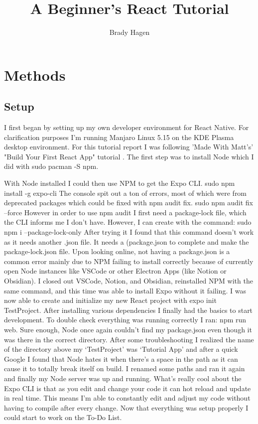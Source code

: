\documentclass[10pt,twocolumn]{article}
\title{A Beginner's React Tutorial}
\author{Brady Hagen}
\affiliation{Occidental College}
\begin{document}
\maketitle

\section{Methods}
\subsection{Setup}
I first began by setting up my own developer environment for React Native. For clarification purposes I’m running Manjaro Linux  5.15 on the KDE Plasma desktop environment. For this tutorial report I was following 'Made With Matt's' "Build Your First React App" tutorial \cite{BuildingMyFirstReactApp}.
The first step was to install Node which I did with
sudo pacman -S npm.


With Node installed I could then use NPM to get the Expo CLI.
sudo npm install -g expo-cli
The console spit out a ton of errors, most of which were from deprecated packages which could be fixed with npm audit fix.
sudo npm audit fix –force
However in order to use npm audit I first need a package-lock file, which the CLI informs me I don’t have. However, I can create with the command:
sudo npm i –package-lock-only
After trying it I found that this command doesn’t work as it needs another .json file. It needs a (package.json to complete and make the package-lock.json file. Upon looking online, not having a package.json is a common error mainly due to NPM failing to install correctly because of currently open Node instances like VSCode or other Electron Apps (like Notion or Obsidian).
I closed out VSCode, Notion, and Obsidian, reinstalled NPM with the same command, and this time was able to install Expo without it failing.
I was now able to create and initialize my new React project with expo init TestProject.
After installing various dependencies I finally had the basics to start development. To double check everything was running correctly I ran: npm run web.
Sure enough, Node once again couldn’t find my package.json even though it was there in the correct directory. After some troubleshooting I realized the name of the directory above my ‘TestProject’ was ‘Tutorial App’ and after a quick Google I found that Node hates it when there’s a space in the path as it can cause it to totally break itself on build. I renamed some paths and ran it again and finally my Node server was up and running.
What’s really cool about the Expo CLI is that as you edit and change your code it can hot reload and update in real time. This means I’m able to constantly edit and adjust my code without having to compile after every change.
Now that everything was setup properly I could start to work on the To-Do List.
\end{document}
